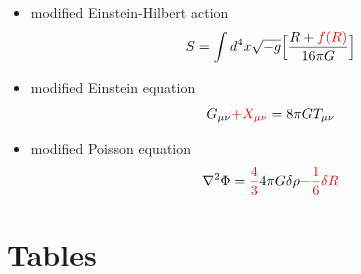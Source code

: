\documentclass{fancyslides}
\newenvironment{typewriter}{\ttfamily}{\par}
\begin{document}
\begin{frame}
	\begin{typewriter}
	\vspace{4em}
	\begin{itemize} %
		\item modified Einstein-Hilbert action\\
			\begin{equation*}
				S=\int d^{4}x\sqrt{-g} \Big[\frac{R + {\color{red}f(R)}}{16\pi G} \Big]
			\end{equation*}
		\item modified Einstein equation\\
			\begin{equation*}
				G_{\mu\nu} {\color{red}+ X_{\mu\nu}} = 8\pi G T_{\mu\nu}
			\end{equation*}
		\item modified Poisson equation\\
			\begin{equation*}
				\nabla^{2}\Phi = {\color{red}\frac{4}{3}}4\pi G\delta\rho {\color{red}- \frac{1}{6}\delta R}
			\end{equation*}
	\end{itemize}
	\end{typewriter}
\end{frame}

\section{Tables}
\end{document}

